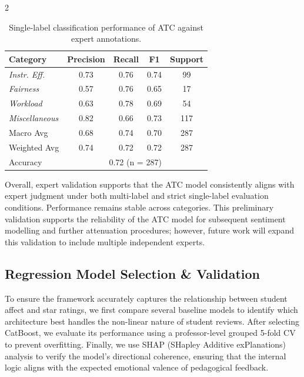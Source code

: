 \documentclass{article}
\begin{document}
\begin{multicols*}{2}
\begin{table}[H]
\caption{Single-label classification performance of ATC against expert annotations.}
\centering
\small
\begin{tabular}{lcccc}
\hline
\textbf{Category} & \textbf{Precision} & \textbf{Recall} & \textbf{F1} & \textbf{Support} \\
\hline
\textit{Instr. Eff.} & 0.73 & 0.76 & 0.74 & 99 \\
\textit{Fairness} & 0.57 & 0.76 & 0.65 & 17 \\
\textit{Workload} & 0.63 & 0.78 & 0.69 & 54 \\
\textit{Miscellaneous} & 0.82 & 0.66 & 0.73 & 117 \\
\hline
Macro Avg & 0.68 & 0.74 & 0.70 & 287 \\
Weighted Avg & 0.74 & 0.72 & 0.72 & 287 \\
\hline
Accuracy & \multicolumn{4}{c}{0.72 (n = 287)} \\
\hline
\end{tabular}
\label{tab:atc-classification-report}
\end{table}



Overall, expert validation supports that the ATC model consistently aligns with expert judgment under both multi-label and strict single-label evaluation conditions. Performance remains stable across categories. This preliminary validation supports the reliability of the ATC model for subsequent sentiment modelling and further attenuation procedures; however, future work will expand this validation to include multiple independent experts.

\subsection{Regression Model Selection \& Validation}
To ensure the framework accurately captures the relationship between student affect and star ratings, we first compare several baseline models to identify which architecture best handles the non-linear nature of student reviews. After selecting CatBoost, we evaluate its performance using a professor-level grouped 5-fold CV to prevent overfitting. Finally, we use SHAP (SHapley Additive exPlanations) analysis to verify the model's directional coherence, ensuring that the internal logic aligns with the expected emotional valence of pedagogical feedback.


\end{multicols*}
\end{document}
